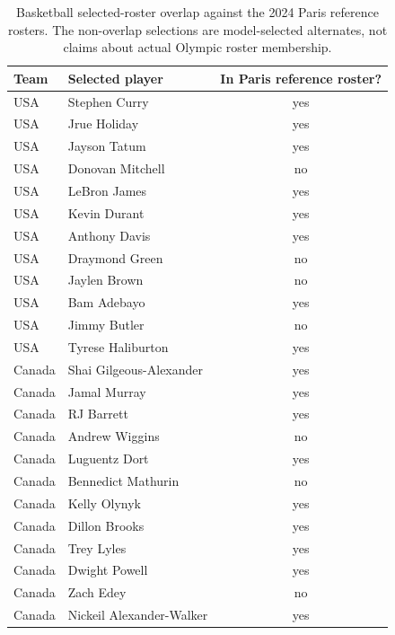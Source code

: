 \documentclass[11pt,letterpaper]{article}
\begin{document}
\begin{table}[htbp]
  \centering
  \small
  \caption{Basketball selected-roster overlap against the 2024 Paris
    reference rosters. The non-overlap selections are model-selected
    alternates, not claims about actual Olympic roster membership.}
  \begin{tabular}{l l c}
    \toprule
    Team & Selected player & In Paris reference roster? \\
    \midrule
    USA & Stephen Curry & yes \\
    USA & Jrue Holiday & yes \\
    USA & Jayson Tatum & yes \\
    USA & Donovan Mitchell & no \\
    USA & LeBron James & yes \\
    USA & Kevin Durant & yes \\
    USA & Anthony Davis & yes \\
    USA & Draymond Green & no \\
    USA & Jaylen Brown & no \\
    USA & Bam Adebayo & yes \\
    USA & Jimmy Butler & no \\
    USA & Tyrese Haliburton & yes \\
    Canada & Shai Gilgeous-Alexander & yes \\
    Canada & Jamal Murray & yes \\
    Canada & RJ Barrett & yes \\
    Canada & Andrew Wiggins & no \\
    Canada & Luguentz Dort & yes \\
    Canada & Bennedict Mathurin & no \\
    Canada & Kelly Olynyk & yes \\
    Canada & Dillon Brooks & yes \\
    Canada & Trey Lyles & yes \\
    Canada & Dwight Powell & yes \\
    Canada & Zach Edey & no \\
    Canada & Nickeil Alexander-Walker & yes \\
    \bottomrule
  \end{tabular}
\end{table}
\end{document}
